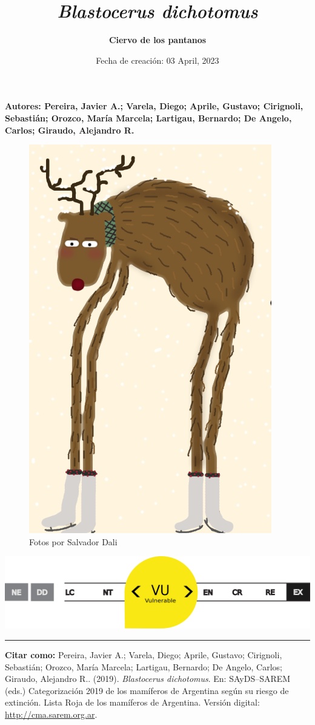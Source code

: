 \documentclass[
  x11names]{article}
\title{\emph{Blastocerus dichotomus}}
\subtitle{\textbf{Ciervo de los pantanos}}
\author{}
\date{\vspace{-2.5em}Fecha de creación: 03 April, 2023}
\begin{document}
\maketitle


\center

\textbf{Autores: Pereira, Javier A.; Varela, Diego; Aprile, Gustavo;
Cirignoli, Sebastián; Orozco, María Marcela; Lartigau, Bernardo; De
Angelo, Carlos; Giraudo, Alejandro R.}

\begin{figure}[H]

{\centering \includegraphics[width=0.35\linewidth]{photos/Blastocerus dichotomus} 

}

\caption{Fotos por Salvador Dali}\label{fig:image}
\end{figure}

\begin{center}\includegraphics[width=0.7\linewidth]{images/scale-vu} \end{center}

\begin{center}\rule{0.5\linewidth}{0.5pt}\end{center}

\justifying

\textbf{Citar como:} Pereira, Javier A.; Varela, Diego; Aprile, Gustavo;
Cirignoli, Sebastián; Orozco, María Marcela; Lartigau, Bernardo; De
Angelo, Carlos; Giraudo, Alejandro R.. (2019). \emph{Blastocerus
dichotomus}. En: SAyDS--SAREM (eds.) Categorización 2019 de los
mamíferos de Argentina según su riesgo de extinción. Lista Roja de los
mamíferos de Argentina. Versión digital: \url{http://cma.sarem.org.ar}.
\end{document}
